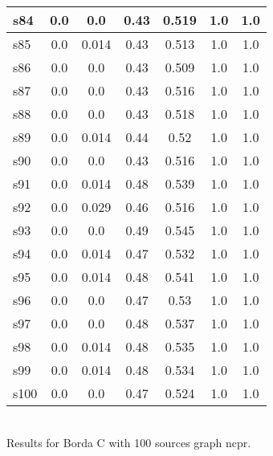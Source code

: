 \documentclass{article}
\begin{document}
\begin{tabular}{|l|c|c|c|c|c|c|}
\hline
s84 &0.0 & 0.0 & 0.43 & 0.519 & 1.0 & 1.0\\
\hline
s85 &0.0 & 0.014 & 0.43 & 0.513 & 1.0 & 1.0\\
\hline
s86 &0.0 & 0.0 & 0.43 & 0.509 & 1.0 & 1.0\\
\hline
s87 &0.0 & 0.0 & 0.43 & 0.516 & 1.0 & 1.0\\
\hline
s88 &0.0 & 0.0 & 0.43 & 0.518 & 1.0 & 1.0\\
\hline
s89 &0.0 & 0.014 & 0.44 & 0.52 & 1.0 & 1.0\\
\hline
s90 &0.0 & 0.0 & 0.43 & 0.516 & 1.0 & 1.0\\
\hline
s91 &0.0 & 0.014 & 0.48 & 0.539 & 1.0 & 1.0\\
\hline
s92 &0.0 & 0.029 & 0.46 & 0.516 & 1.0 & 1.0\\
\hline
s93 &0.0 & 0.0 & 0.49 & 0.545 & 1.0 & 1.0\\
\hline
s94 &0.0 & 0.014 & 0.47 & 0.532 & 1.0 & 1.0\\
\hline
s95 &0.0 & 0.014 & 0.48 & 0.541 & 1.0 & 1.0\\
\hline
s96 &0.0 & 0.0 & 0.47 & 0.53 & 1.0 & 1.0\\
\hline
s97 &0.0 & 0.0 & 0.48 & 0.537 & 1.0 & 1.0\\
\hline
s98 &0.0 & 0.014 & 0.48 & 0.535 & 1.0 & 1.0\\
\hline
s99 &0.0 & 0.014 & 0.48 & 0.534 & 1.0 & 1.0\\
\hline
s100 &0.0 & 0.0 & 0.47 & 0.524 & 1.0 & 1.0\\
\hline
\end{tabular}\\

\noindent Results for Borda C with 100 sources graph ncpr.
\end{document}
